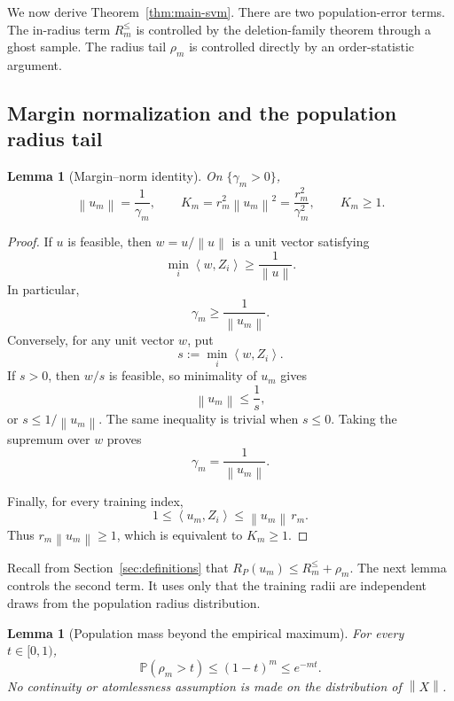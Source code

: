 \documentclass[11pt]{article}
\newtheorem{lemma}[theorem]{Lemma}
\theoremstyle{definition}
\theoremstyle{remark}
\newcommand{\Pp}{\mathbb P}
\newcommand{\ip}[2]{\left\langle #1,#2\right\rangle}
\newcommand{\norm}[1]{\left\lVert #1\right\rVert}
\newcommand{\Risk}{R_P}
\begin{document}
We now derive Theorem~\ref{thm:main-svm}. There are two population-error
terms. The in-radius term \(R_m^{\le}\) is controlled by the deletion-family
theorem through a ghost sample. The radius tail \(\rho_m\) is controlled
directly by an order-statistic argument.

\subsection{Margin normalization and the population radius tail}

\begin{lemma}[Margin--norm identity]
\label{lem:margin-norm}
On \(\{\gamma_m>0\}\),
\[
 \boxed{
 \norm{u_m}=\frac1{\gamma_m},
 \qquad
 K_m=r_m^2\norm{u_m}^2
 =\frac{r_m^2}{\gamma_m^2},
 \qquad
 K_m\ge1.}
 \tag{4.1}
\]
\end{lemma}

\begin{proof}
If \(u\) is feasible, then \(w=u/\norm u\) is a unit vector satisfying
\[
 \min_i\ip{w}{Z_i}\ge\frac1{\norm u}.
\]
In particular,
\[
 \gamma_m\ge\frac1{\norm{u_m}}.
\]
Conversely, for any unit vector \(w\), put
\[
 s:=\min_i\ip{w}{Z_i}.
\]
If \(s>0\), then \(w/s\) is feasible, so minimality of \(u_m\) gives
\[
 \norm{u_m}\le\frac1s,
\]
or \(s\le1/\norm{u_m}\). The same inequality is trivial when \(s\le0\).
Taking the supremum over \(w\) proves
\[
 \gamma_m=\frac1{\norm{u_m}}.
\]

Finally, for every training index,
\[
 1\le\ip{u_m}{Z_i}\le\norm{u_m}\,r_m.
\]
Thus \(r_m\norm{u_m}\ge1\), which is equivalent to \(K_m\ge1\).
\end{proof}

Recall from Section~\ref{sec:definitions} that
\(\Risk(u_m)\le R_m^{\le}+\rho_m\). The next lemma controls the second term.
It uses only that the training radii are independent draws from the
population radius distribution.

\begin{lemma}[Population mass beyond the empirical maximum]
\label{lem:radius-tail}
For every \(t\in[0,1)\),
\[
 \boxed{
 \Pp(\rho_m>t)
 \le
 (1-t)^m
 \le
 e^{-mt}.}
 \tag{4.2}
\]
No continuity or atomlessness assumption is made on the distribution of
\(\norm X\).
\end{lemma}
\end{document}
